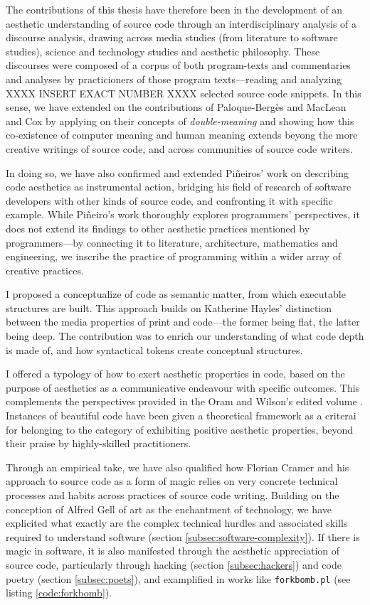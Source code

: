 The contributions of this thesis have therefore been in the development of an aesthetic understanding of source code through an interdisciplinary analysis of a discourse analysis, drawing across media studies (from literature to software studies), science and technology studies and aesthetic philosophy. These discourses were composed of a corpus of both program-texts and commentaries and analyses by practicioners of those program texts—reading and analyzing  XXXX INSERT EXACT NUMBER XXXX selected source code snippets. In this sense, we have extended on the contributions of Paloque-Bergès and MacLean and Cox by applying on their concepts of \emph{double-meaning} and showing how this co-existence of computer meaning and human meaning extends beyong the more creative writings of source code, and across communities of source code writers.

In doing so, we have also confirmed and extended Piñeiros' work on describing code aesthetics as instrumental action, bridging his field of research of software developers with other kinds of source code, and confronting it with specific example. While Piñeiro's work thoroughly explores programmers' perspectives, it does not extend its findings to other aesthetic practices mentioned by programmers—by connecting it to literature, architecture, mathematics and engineering, we inscribe the practice of programming within a wider array of creative practices.

I proposed a conceptualize of code as semantic matter, from which executable structures are built. This approach builds on Katherine Hayles' distinction between the media properties of print and code—the former being flat, the latter being deep. The contribution was to enrich our understanding of what code depth is made of, and how syntactical tokens create conceptual structures.

I offered a typology of how to exert aesthetic properties in code, based on the purpose of aesthetics as a communicative endeavour with specific outcomes. This complements the perspectives provided in the Oram and Wilson's edited volume \citep{oram_beautiful_2007}. Instances of beautiful code have been given a theoretical framework as a criterai for belonging to the category of exhibiting positive aesthetic properties, beyond their praise by highly-skilled practitioners.

Through an empirical take, we have also qualified how Florian Cramer and his approach to source code as a form of magic relies on very concrete technical processes and habits across practices of source code writing. Building on the conception of Alfred Gell of art as the enchantment of technology, we have explicited what exactly are the complex technical hurdles and associated skills required to understand software (section \ref{subsec:software-complexity}). If there is magic in software, it is also manifested through the aesthetic appreciation of source code, particularly through hacking (section \ref{subsec:hackers}) and code poetry (section \ref{subsec:poets}), and examplified in works like \lstinline{forkbomb.pl} (see listing \ref{code:forkbomb}).

